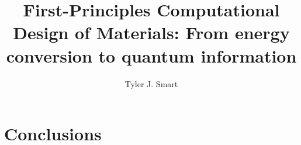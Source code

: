 \documentclass[12pt]{../include/ucthesis}
\begin{document}
\title{First-Principles Computational Design of Materials: From energy conversion to quantum information}
\author{Tyler J. Smart}
\deanlinethree{}

\begin{frontmatter}
\maketitle

\copyrightpage

\tableofcontents

\listoffigures

\listoftables



% 

\end{frontmatter}

















% 
% 
% 
% 
% 

\chapter{Conclusions}


\appendix








% 


\nocite{*}
% 

\singlespacing


\doublespacing
\end{document}
